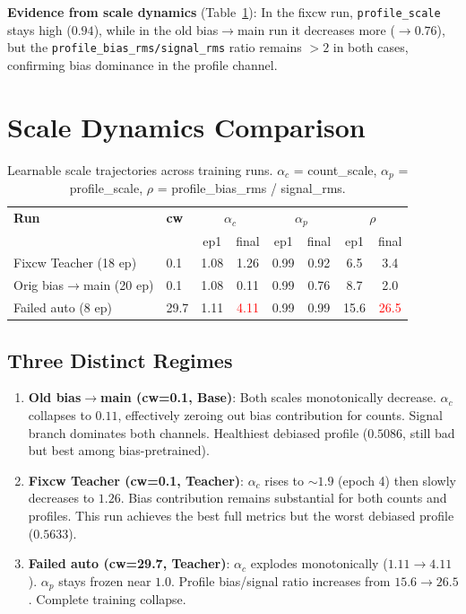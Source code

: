 \documentclass[11pt,a4paper]{article}
\newcommand{\worse}[1]{\textcolor{red}{#1}}
\begin{document}
\textbf{Evidence from scale dynamics} (Table~\ref{tab:scales}): In the fixcw run, \texttt{profile\_scale} stays high ($0.94$), while in the old bias$\to$main run it decreases more ($\to 0.76$), but the \texttt{profile\_bias\_rms/signal\_rms} ratio remains $> 2$ in both cases, confirming bias dominance in the profile channel.

\section{Scale Dynamics Comparison}
\label{sec:scales}

\begin{table}[h]
\centering
\caption{Learnable scale trajectories across training runs. $\alpha_c$ = count\_scale, $\alpha_p$ = profile\_scale, $\rho$ = profile\_bias\_rms / signal\_rms.}
\label{tab:scales}
\small
\begin{tabular}{l l c c c c c c}
\toprule
\textbf{Run} & \textbf{cw} & \multicolumn{2}{c}{\textbf{$\alpha_c$}} & \multicolumn{2}{c}{\textbf{$\alpha_p$}} & \multicolumn{2}{c}{\textbf{$\rho$}} \\
& & ep1 & final & ep1 & final & ep1 & final \\
\midrule
Fixcw Teacher (18 ep) & 0.1 & 1.08 & 1.26 & 0.99 & 0.92 & 6.5 & 3.4 \\
Orig bias$\to$main (20 ep) & 0.1 & 1.08 & 0.11 & 0.99 & 0.76 & 8.7 & 2.0 \\
Failed auto (8 ep) & 29.7 & 1.11 & \worse{4.11} & 0.99 & 0.99 & 15.6 & \worse{26.5} \\
\bottomrule
\end{tabular}
\end{table}

\subsection{Three Distinct Regimes}

\begin{enumerate}
\item \textbf{Old bias$\to$main (cw=0.1, Base)}: Both scales monotonically decrease. $\alpha_c$ collapses to $0.11$, effectively zeroing out bias contribution for counts. Signal branch dominates both channels. Healthiest debiased profile ($0.5086$, still bad but best among bias-pretrained).

\item \textbf{Fixcw Teacher (cw=0.1, Teacher)}: $\alpha_c$ rises to $\sim1.9$ (epoch 4) then slowly decreases to $1.26$. Bias contribution remains substantial for both counts and profiles. This run achieves the best full metrics but the worst debiased profile ($0.5633$).

\item \textbf{Failed auto (cw=29.7, Teacher)}: $\alpha_c$ explodes monotonically ($1.11 \to 4.11$). $\alpha_p$ stays frozen near $1.0$. Profile bias/signal ratio increases from $15.6 \to 26.5$. Complete training collapse.
\end{enumerate}
\end{document}
